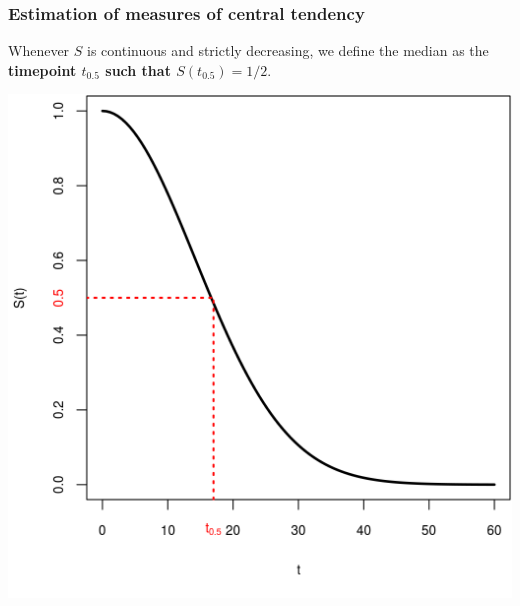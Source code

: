 \documentclass[10pt,t]{beamer}
\begin{document}
\begin{frame}
\frametitle{Estimation of measures of central tendency}
Whenever $S$ is continuous and strictly decreasing, we define the median as the \textbf{timepoint $t_{0.5}$ such that $S(t_{0.5}) = 1/2$}.

\begin{center}
\includegraphics[width=0.7\textheight]{figs/survival_function_median.png}
\end{center}
\end{frame}
\end{document}
